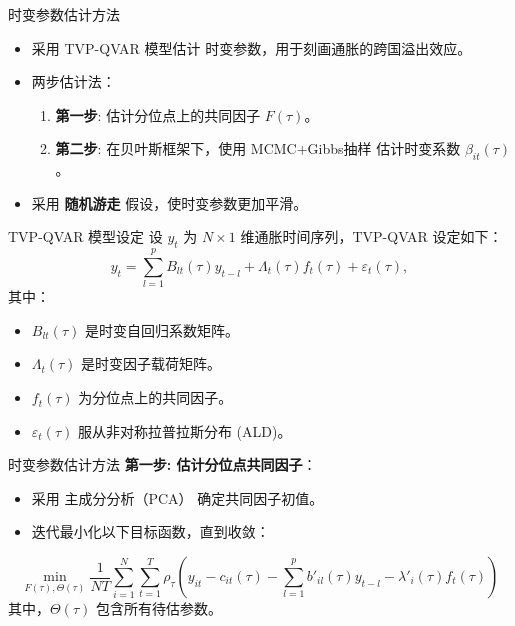 \documentclass{beamer}
\begin{document}
\begin{frame}{时变参数估计方法}
  \begin{itemize}
      \item 采用 TVP-QVAR 模型估计 时变参数，用于刻画通胀的跨国溢出效应。
      \item 两步估计法：
      \begin{enumerate}
          \item \textbf{第一步}: 估计分位点上的共同因子 \( F(\tau) \)。
          \item \textbf{第二步}: 在贝叶斯框架下，使用 MCMC+Gibbs抽样 估计时变系数 \( \beta_{it}(\tau) \)。
      \end{enumerate}
      \item 采用 \textbf{随机游走} 假设，使时变参数更加平滑。
  \end{itemize}
\end{frame}

\begin{frame}{TVP-QVAR 模型设定}
  设 \( y_t \) 为 \( N \times 1 \) 维通胀时间序列，TVP-QVAR 设定如下：
  \begin{equation}
      y_t = \sum_{l=1}^{p} B_{lt}(\tau) y_{t-l} + \Lambda_t(\tau) f_t(\tau) + \varepsilon_t(\tau),
  \end{equation}
  其中：
  \begin{itemize}
      \item \( B_{lt}(\tau) \) 是时变自回归系数矩阵。
      \item \( \Lambda_t(\tau) \) 是时变因子载荷矩阵。
      \item \( f_t(\tau) \) 为分位点上的共同因子。
      \item \( \varepsilon_t(\tau) \) 服从非对称拉普拉斯分布 (ALD)。
  \end{itemize}
\end{frame}

\begin{frame}{时变参数估计方法}
  \textbf{第一步: 估计分位点共同因子}：
  \begin{itemize}
      \item 采用 主成分分析（PCA） 确定共同因子初值。
      \item 迭代最小化以下目标函数，直到收敛：
  \end{itemize}
  \begin{equation}
      \min_{F(\tau), \Theta(\tau)} \frac{1}{NT} \sum_{i=1}^{N} \sum_{t=1}^{T} \rho_\tau \left( y_{it} - c_{it}(\tau) - \sum_{l=1}^{p} b'_{il}(\tau) y_{t-l} - \lambda'_i(\tau) f_t(\tau) \right)
  \end{equation}
  其中，\( \Theta(\tau) \) 包含所有待估参数。
\end{frame}
\end{document}
